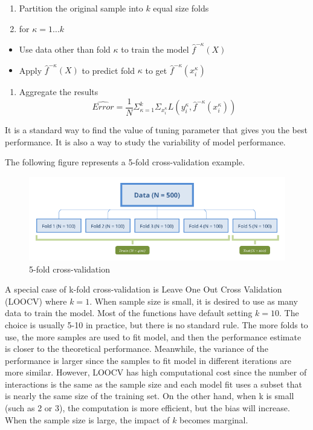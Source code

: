 \documentclass[12pt,]{krantz}
\providecommand{\tightlist}{%
  \setlength{\itemsep}{0pt}\setlength{\parskip}{0pt}}
\renewenvironment{quote}{\begin{VF}}{\end{VF}}
\theoremstyle{definition}
\theoremstyle{definition}
\theoremstyle{definition}
\theoremstyle{remark}
\begin{document}
\begin{quote}
\begin{enumerate}
\def\labelenumi{\arabic{enumi}.}
\tightlist
\item
  Partition the original sample into \(k\) equal size folds
\item
  for \(\kappa=1…k\)
\end{enumerate}

\begin{itemize}
\tightlist
\item
  Use data other than fold \(\kappa\) to train the model
  \(\hat{f}^{-\kappa}(X)\)
\item
  Apply \(\hat{f}^{-\kappa}(X)\) to predict fold \(\kappa\) to get
  \(\hat{f}^{-\kappa}(x_i^\kappa)\)
\end{itemize}

\begin{enumerate}
\def\labelenumi{\arabic{enumi}.}
\setcounter{enumi}{2}
\tightlist
\item
  Aggregate the results
  \[\hat{Error} = \frac{1}{N}\Sigma_{\kappa=1}^k\Sigma_{x_i^{\kappa}}L(y_i^{\kappa},\hat{f}^{-\kappa}(x_i^\kappa))\]
\end{enumerate}
\end{quote}

It is a standard way to find the value of tuning parameter that gives
you the best performance. It is also a way to study the variability of
model performance.

The following figure represents a 5-fold cross-validation example.

\begin{figure}
\centering
\includegraphics{images/cv5fold.png}
\caption{5-fold cross-validation}
\end{figure}

A special case of k-fold cross-validation is Leave One Out Cross
Validation (LOOCV) where \(k=1\). When sample size is small, it is
desired to use as many data to train the model. Most of the functions
have default setting \(k=10\). The choice is usually 5-10 in practice,
but there is no standard rule. The more folds to use, the more samples
are used to fit model, and then the performance estimate is closer to
the theoretical performance. Meanwhile, the variance of the performance
is larger since the samples to fit model in different iterations are
more similar. However, LOOCV has high computational cost since the
number of interactions is the same as the sample size and each model fit
uses a subset that is nearly the same size of the training set. On the
other hand, when k is small (such as 2 or 3), the computation is more
efficient, but the bias will increase. When the sample size is large,
the impact of \(k\) becomes marginal.
\end{document}
